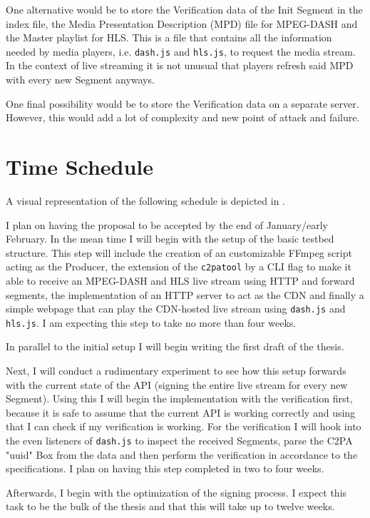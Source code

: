 \documentclass[a4paper]{article}
\begin{document}
One alternative would be to store the Verification data of the Init Segment in the index file, the Media Presentation Description (MPD) file for MPEG-DASH and the Master playlist for HLS. This is a file that contains all the information needed by media players, i.e. \texttt{dash.js} and \texttt{hls.js}, to request the media stream. In the context of live streaming it is not unusual that players refresh said MPD with every new Segment anyways.

One final possibility would be to store the Verification data on a separate server. However, this would add a lot of complexity and new point of attack and failure.

\section{Time Schedule} 

A visual representation of the following schedule is depicted in .

I plan on having the proposal to be accepted by the end of January/early February. In the mean time I will begin with the setup of the basic testbed structure. This step will include the creation of an customizable FFmpeg script acting as the Producer, the extension of the \texttt{c2patool} by a CLI flag to make it able to receive an MPEG-DASH and HLS live stream using HTTP and forward segments, the implementation of an HTTP server to act as the CDN and finally a simple webpage that can play the CDN-hosted live stream using \texttt{dash.js} and \texttt{hls.js}. I am expecting this step to take no more than four weeks.

In parallel to the initial setup I will begin writing the first draft of the thesis.

Next, I will conduct a rudimentary experiment to see how this setup forwards with the current state of the API (signing the entire live stream for every new Segment). Using this I will begin the implementation with the verification first, because it is safe to assume that the current API is working correctly and using that I can check if my verification is working. For the verification I will hook into the even listeners of \texttt{dash.js} to inspect the received Segments, parse the C2PA "uuid" Box from the data and then perform the verification in accordance to the specifications. I plan on having this step completed in two to four weeks.

Afterwards, I begin with the optimization of the signing process. I expect this task to be the bulk of the thesis and that this will take up to twelve weeks.
\end{document}
